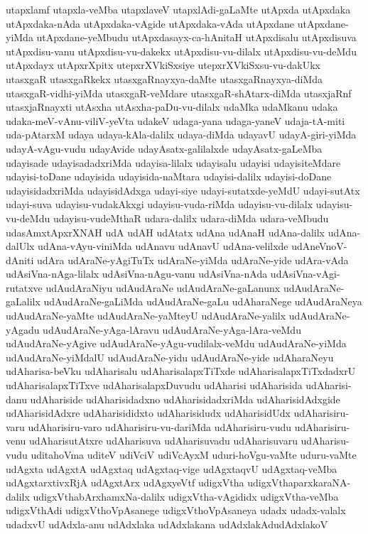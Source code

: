 {utapxlamf
utapxla-veMba
utapxlaveV
utapxlAdi-gaLaMte
utApxda
utApxdaka
utApxdaka-nAda
utApxdaka-vAgide
utApxdaka-vAda
utApxdane
utApxdane-yiMda
utApxdane-yeMbudu
utApxdasayx-ca-hAnitaH
utApxdisalu
utApxdisuva
utApxdisu-vanu
utApxdisu-vu-dakekx
utApxdisu-vu-dilalx
utApxdisu-vu-deMdu
utApxdayx
utApxrXpitx
utepxrXVkiSxsiye
utepxrXVkiSxsu-vu-dakUkx
utasxgaR
utasxgaRkekx
utasxgaRnayxya-daMte
utasxgaRnayxya-diMda
utasxgaR-vidhi-yiMda
utasxgaR-veMdare
utasxgaR-shAtarx-diMda
utasxjaRnf
utasxjaRnayxti
utAsxha
utAsxha-paDu-vu-dilalx
udaMka
udaMkanu
udaka
udaka-meV-vAnu-viliV-yeVta
udakeV
udaga-yana
udaga-yaneV
udaja-tA-miti
uda-pAtarxM
udaya
udaya-kAla-dalilx
udaya-diMda
udayavU
udayA-giri-yiMda
udayA-vAgu-vudu
udayAvide
udayAsatx-galilalxde
udayAsatx-gaLeMba
udayisade
udayisadadxriMda
udayisa-lilalx
udayisalu
udayisi
udayisiteMdare
udayisi-toDane
udayisida
udayisida-naMtara
udayisi-dalilx
udayisi-doDane
udayisidadxriMda
udayisidAdxga
udayi-siye
udayi-sutatxde-yeMdU
udayi-sutAtx
udayi-suva
udayisu-vudakAkxgi
udayisu-vuda-riMda
udayisu-vu-dilalx
udayisu-vu-deMdu
udayisu-vudeMthaR
udara-dalilx
udara-diMda
udara-veMbudu
udasAmxtApxrXNAH
udA
udAH
udAtatx
udAna
udAnaH
udAna-dalilx
udAna-dalUlx
udAna-vAyu-viniMda
udAnavu
udAnavU
udAna-velilxde
udAneVnoV-dAniti
udAra
udAraNe-yAgiTuTx
udAraNe-yiMda
udAraNe-yide
udAra-vAda
udAsiVna-nAga-lilalx
udAsiVna-nAgu-vanu
udAsiVna-nAda
udAsiVna-vAgi-rutatxve
udAudAraNiyu
udAudAraNe
udAudAraNe-gaLanunx
udAudAraNe-gaLalilx
udAudAraNe-gaLiMda
udAudAraNe-gaLu
udAharaNege
udAudAraNeya
udAudAraNe-yaMte
udAudAraNe-yaMteyU
udAudAraNe-yalilx
udAudAraNe-yAgadu
udAudAraNe-yAga-lAravu
udAudAraNe-yAga-lAra-veMdu
udAudAraNe-yAgive
udAudAraNe-yAgu-vudilalx-veMdu
udAudAraNe-yiMda
udAudAraNe-yiMdalU
udAudAraNe-yidu
udAudAraNe-yide
udAharaNeyu
udAharisa-beVku
udAharisalu
udAharisalapxTiTxde
udAharisalapxTiTxdadxrU
udAharisalapxTiTxve
udAharisalapxDuvudu
udAharisi
udAharisida
udAharisi-danu
udAhariside
udAharisidadxno
udAharisidadxriMda
udAharisidAdxgide
udAharisidAdxre
udAharisididxto
udAharisidudx
udAharisidUdx
udAharisiru-varu
udAharisiru-varo
udAharisiru-vu-dariMda
udAharisiru-vudu
udAharisiru-venu
udAharisutAtxre
udAharisuva
udAharisuvadu
udAharisuvaru
udAharisu-vudu
uditahoVma
uditeV
udiVciV
udiVcAyxM
uduri-hoVgu-vaMte
uduru-vaMte
udAgxta
udAgxtA
udAgxtaq
udAgxtaq-vige
udAgxtaqvU
udAgxtaq-veMba
udAgxtarxtivxRjA
udAgxtArx
udAgxyeVtf
udigxVtha
udigxVthaparxkaraNA-dalilx
udigxVthabArxhamxNa-dalilx
udigxVtha-vAgididx
udigxVtha-veMba
udigxVthAdi
udigxVthoVpAsanege
udigxVthoVpAsaneya
udadx
udadx-valalx
udadxvU
udAdxla-anu
udAdxlaka
udAdxlakana
udAdxlakAdudAdxlakoV
}

